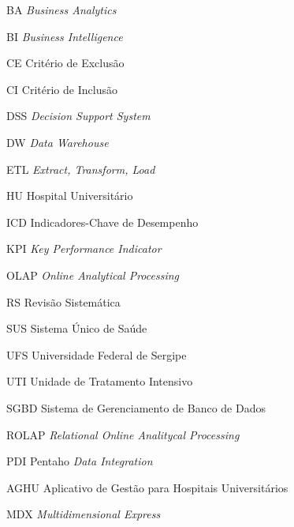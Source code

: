 
\begin{siglas}
	\item[BA]{\textit{Business Analytics}}
    \item[BI]{\textit{Business Intelligence}}
    \item[CE]{Critério de Exclusão}
    \item[CI]{Critério de Inclusão}
    \item[DSS]{\textit{Decision Support System}}
    \item[DW]{\textit{Data Warehouse}}
    \item[ETL]{\textit{Extract, Transform, Load}}
  	\item[HU]{Hospital Universitário}
  	\item[ICD]{Indicadores-Chave de Desempenho}
    \item[KPI]{\textit{Key Performance Indicator}}
    \item[OLAP]{\textit{Online Analytical Processing}}
    \item[RS]{Revisão Sistemática}
    \item[SUS]{Sistema Único de Saúde}
	\item[UFS]{Universidade Federal de Sergipe}
	\item[UTI]{Unidade de Tratamento Intensivo}
	\item[SGBD]{Sistema de Gerenciamento de Banco de Dados}
	\item[ROLAP]{\textit{Relational Online Analitycal Processing}}
	\item[PDI]{Pentaho \textit{Data Integration}}
	\item[AGHU]{Aplicativo de Gestão para Hospitais Universitários}
	\item[MDX]{\textit{Multidimensional Express}}
\end{siglas}